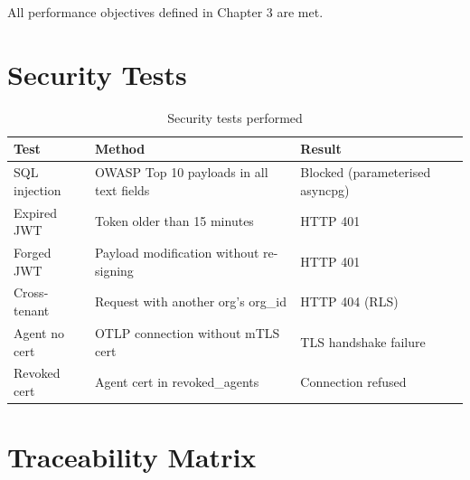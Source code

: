 All performance objectives defined in Chapter 3 are met.

\section{Security Tests}

\begin{table}[H]
\centering
\caption{Security tests performed}
\label{tab:security-tests}
\small
\begin{tabularx}{\textwidth}{lXl}
\toprule
\textbf{Test} & \textbf{Method} & \textbf{Result} \\
\midrule
SQL injection    & OWASP Top 10 payloads in all text fields & Blocked (parameterised asyncpg) \\
Expired JWT      & Token older than 15 minutes             & HTTP 401 \\
Forged JWT       & Payload modification without re-signing  & HTTP 401 \\
Cross-tenant     & Request with another org's org\_id       & HTTP 404 (RLS) \\
Agent no cert    & OTLP connection without mTLS cert        & TLS handshake failure \\
Revoked cert     & Agent cert in revoked\_agents            & Connection refused \\
\bottomrule
\end{tabularx}
\end{table}

\section{Traceability Matrix}

